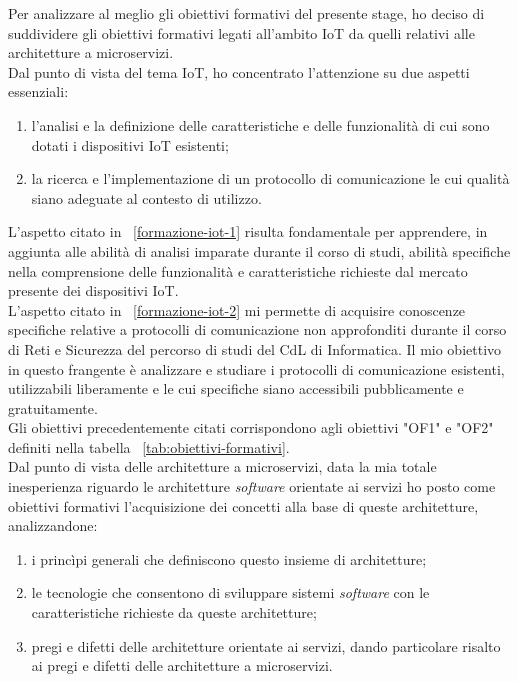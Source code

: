 Per analizzare al meglio gli obiettivi formativi del presente stage, ho deciso di suddividere gli obiettivi formativi legati all'ambito IoT da quelli relativi alle architetture a microservizi. \\
Dal punto di vista del tema IoT, ho concentrato l'attenzione su due aspetti essenziali:
\begin{enumerate}
  \item \label{formazione-iot-1} l'analisi e la definizione delle caratteristiche e delle funzionalità di cui sono dotati i dispositivi IoT esistenti;
  \item \label{formazione-iot-2} la ricerca e l'implementazione di un protocollo di comunicazione le cui qualità siano adeguate al contesto di utilizzo.
\end{enumerate}
\smallskip
L'aspetto citato in ~\ref{formazione-iot-1} risulta fondamentale per apprendere, in aggiunta alle  abilità di analisi imparate durante il corso di studi, abilità specifiche nella comprensione delle funzionalità e caratteristiche richieste dal mercato presente dei dispositivi IoT. \\
L'aspetto citato in ~\ref{formazione-iot-2} mi permette di acquisire conoscenze specifiche relative a protocolli di comunicazione non approfonditi durante il corso di Reti e Sicurezza del percorso di studi del CdL di Informatica. Il mio obiettivo in questo frangente è analizzare e studiare i protocolli di comunicazione esistenti, utilizzabili liberamente e le cui specifiche siano accessibili pubblicamente e gratuitamente. \\
Gli obiettivi precedentemente citati corrispondono agli obiettivi "OF1" e "OF2" definiti nella tabella ~\ref{tab:obiettivi-formativi}. \\
Dal punto di vista delle architetture a microservizi, data la mia totale inesperienza riguardo le  architetture \emph{software} orientate ai servizi ho posto come obiettivi formativi l'acquisizione dei concetti alla base di queste architetture, analizzandone:
\begin{enumerate}
  \item \label{formazione-arch-1} i princìpi generali che definiscono questo insieme di architetture;
  \item \label{formazione-arch-2} le tecnologie che consentono di sviluppare sistemi \emph{software} con le caratteristiche richieste da queste architetture;
  \item \label{formazione-arch-3} pregi e difetti delle architetture orientate ai servizi, dando particolare risalto ai pregi e difetti delle architetture a microservizi.
\end{enumerate}
